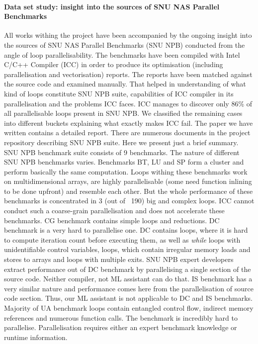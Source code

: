 \documentclass[10pt,a4paper]{report}
\begin{document}
\paragraph{Data set study: insight into the sources of SNU NAS Parallel Benchmarks}
All works withing the project have been accompanied by the ongoing insight into the sources of SNU NAS Parallel Benchmarks (SNU NPB) conducted from the angle of loop parallelisability. The benchmarks have been compiled with Intel C/C++ Compiler (ICC) in order to produce its optimisation (including parallelisation and vectorisation) reports. The reports have been matched against the source code and examined manually. That helped in understanding of what kind of loops constitute SNU NPB suite, capabilities of ICC compiler in its parallelisation and the problems ICC faces. ICC manages to discover only 86\% of all parallelisable loops present in SNU NPB. We classified the remaining cases into different buckets explaining what exactly makes ICC fail. The paper we have written \cite{aiseps} contains a detailed report. There are numerous documents in the project repository \cite{github-ppar-tool} describing SNU NPB suite. Here we present just a brief summary.\newline\null
\quad SNU NPB benchmark suite consists of 9 benchmarks. The nature of different SNU NPB benchmarks varies. Benchmarks BT, LU and SP form a cluster and perform basically the same computation. Loops withing these benchmarks work on multidimensional arrays, are highly parallelisable (some need function inlining to be done upfront) and resemble each other. But the whole performance of these benchmarks is concentrated in 3 (out of ~190) big and complex loops. ICC cannot conduct such a coarse-grain parallelisation and does not accelerate these benchmarks. CG benchmark contains simple loops and reductions. DC benchmark is a very hard to parallelise one. DC contains loops, where it is hard to compute iteration count before executing them, as well as \textit{while} loops with unidentifiable control variables, loops, which contain irregular memory loads and stores to arrays and loops with multiple exits. SNU NPB expert developers extract performance out of DC benchmark by parallelising a single section of the source code. Neither compiler, not ML assistant can do that. IS benchmark has a very similar nature and performance comes here from the parallelisation of source code section. Thus, our ML assistant is not applicable to DC and IS benchmarks. Majority of UA benchmark loops contain entangled control flow, indirect memory references and numerous function calls. The benchmark is incredibly hard to parallelise. Parallelisation requires either an expert benchmark knowledge or runtime information.
\end{document}
